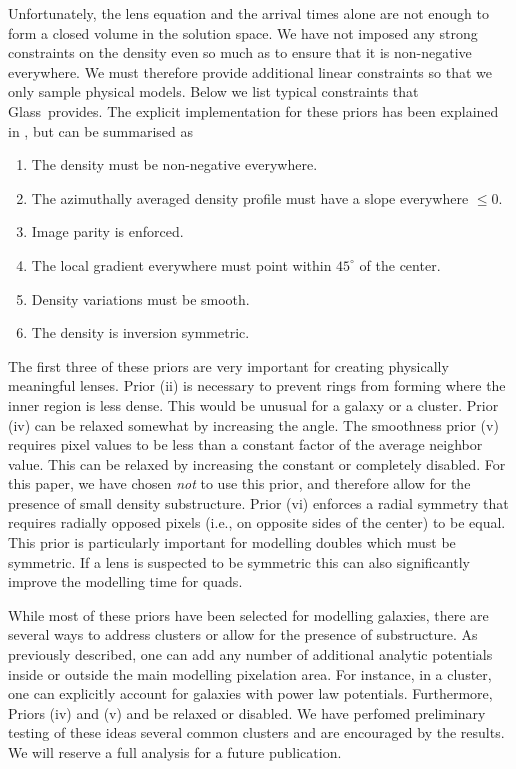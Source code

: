\documentclass[galley,usenatbib]{mn2e}
\newcommand{\Glass}{{\sc Glass}}
\begin{document}
Unfortunately, the lens equation and the arrival times alone are not enough to
form a closed volume in the solution space. We have not imposed any strong
constraints on the density even so much as to ensure that it is non-negative
everywhere. We must therefore provide additional linear constraints so that we
only sample physical models. Below we list typical constraints that \Glass\
provides. The explicit implementation for these priors has
been explained in \cite{2008ApJ...679...17C}, but can be summarised as
%
\begin{enumerate}
\item The density must be non-negative everywhere.
\item The azimuthally averaged density profile must have a slope everywhere $\le 0$.
\item Image parity is enforced.
\item The local gradient everywhere must point within $45^{\circ}$ of the center.
\item Density variations must be smooth.
\item The density is inversion symmetric.
\end{enumerate}

The first three of these priors are very important for creating physically
meaningful lenses. Prior (ii) is necessary to prevent rings from forming where
the inner region is less dense. This would be unusual for a galaxy or a
cluster. Prior (iv) can be relaxed somewhat by increasing the angle. The
smoothness prior (v) requires pixel values to be less than a constant factor of
the average neighbor value. This can be relaxed by increasing the constant or
completely disabled. For this paper, we have chosen \emph{not} to use this
prior, and therefore allow for the presence of small density substructure.
Prior (vi) enforces a radial symmetry that requires radially opposed pixels
(i.e., on opposite sides of the center) to be equal. This prior is particularly
important for modelling doubles which must be symmetric. If a lens is suspected
to be symmetric this can also significantly improve the modelling time for
quads.

While most of these priors have been selected for modelling galaxies, there
are several ways to address clusters or allow for the presence of substructure.
As previously described, one can add any number of additional analytic 
potentials inside or outside the main modelling pixelation area. For instance,
in a cluster, one can explicitly account for galaxies with power law potentials.
Furthermore, Priors (iv) and (v) and be relaxed or disabled. We have perfomed
preliminary testing of these ideas several common clusters and are encouraged
by the results. We will reserve a full analysis for a future publication.
\end{document}
